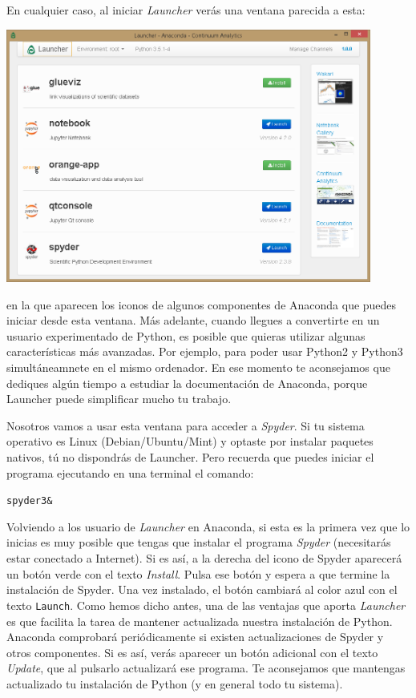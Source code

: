 \documentclass[10pt,a4paper]{article}\usepackage[]{graphicx}\usepackage[]{color}
\makeatletter
\newenvironment{kframe}{%
 \def\at@end@of@kframe{}%
 \ifinner\ifhmode%
  \def\at@end@of@kframe{\end{minipage}}%
  \begin{minipage}{\columnwidth}%
 \fi\fi%
 \def\FrameCommand##1{\hskip\@totalleftmargin \hskip-\fboxsep
 \colorbox{shadecolor}{##1}\hskip-\fboxsep
     \hskip-\linewidth \hskip-\@totalleftmargin \hskip\columnwidth}%
 \MakeFramed {\advance\hsize-\width
   \@totalleftmargin\z@ \linewidth\hsize
   \@setminipage}}%
 {\par\unskip\endMakeFramed%
 \at@end@of@kframe}
\newenvironment{knitrout}{}{} %
\makeatother
\begin{document}
En cualquier caso, al iniciar  {\em Launcher} verás una ventana parecida a esta:
\begin{center}
\includegraphics[width=12cm]{../fig/Tut-00-py-16-Launcher.png}\\[1cm]
\end{center}
en la que aparecen los iconos de algunos componentes de Anaconda que puedes iniciar desde esta ventana. Más adelante, cuando llegues a convertirte en un usuario experimentado de Python, es posible que quieras utilizar algunas características más avanzadas. Por ejemplo, para poder usar Python2 y Python3 simultáneamnete en el mismo ordenador. En ese momento te aconsejamos que dediques algún tiempo a estudiar la documentación de Anaconda, porque Launcher puede simplificar mucho tu trabajo. 

Nosotros vamos a usar esta ventana para acceder a {\em Spyder}. Si tu sistema operativo es Linux (Debian/Ubuntu/Mint) y optaste por instalar paquetes nativos, tú no dispondrás de Launcher. Pero recuerda que puedes iniciar el programa ejecutando en una terminal el comando: 
\begin{knitrout}
\color{fgcolor}\begin{kframe}
\begin{alltt}
spyder3 & 
\end{alltt}
\end{kframe}
\end{knitrout}

Volviendo a los usuario de {\em Launcher} en Anaconda, si esta es la primera vez que lo inicias es muy posible que tengas que instalar el programa {\em Spyder} (necesitarás estar conectado a Internet). Si es así, a la derecha del icono de Spyder aparecerá un botón verde con el texto {\em Install}. Pulsa ese botón y espera a que termine la instalación de Spyder. Una vez instalado, el botón cambiará al color azul con el texto {\tt Launch}. Como hemos dicho antes, una de las ventajas que aporta {\em Launcher} es que facilita la tarea de mantener actualizada nuestra instalación de Python. Anaconda comprobará periódicamente si existen actualizaciones de Spyder y otros componentes. Si es así, verás aparecer un botón adicional con el texto {\em Update}, que al pulsarlo actualizará ese programa. Te aconsejamos que mantengas actualizado tu instalación de Python (y en general todo tu sistema).
\end{document}
